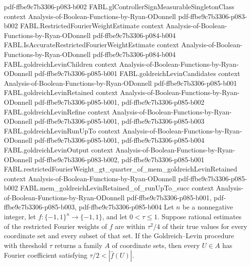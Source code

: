 \begin{theorem}
  {pdf-ffbe9c7b3306-p083-b002}
\proofstep
  {FABL.glControllerSignMeasurableSingletonClass}
  {context}
  {Analysis-of-Boolean-Functions-by-Ryan-ODonnell}
  {pdf-ffbe9c7b3306-p083-b002}
\proofstep
  {FABL.RestrictedFourierWeightEstimate}
  {context}
  {Analysis-of-Boolean-Functions-by-Ryan-ODonnell}
  {pdf-ffbe9c7b3306-p084-b004}
\proofstep
  {FABL.IsAccurateRestrictedFourierWeightEstimate}
  {context}
  {Analysis-of-Boolean-Functions-by-Ryan-ODonnell}
  {pdf-ffbe9c7b3306-p084-b004}
\proofstep
  {FABL.goldreichLevinChildren}
  {context}
  {Analysis-of-Boolean-Functions-by-Ryan-ODonnell}
  {pdf-ffbe9c7b3306-p085-b001}
\proofstep
  {FABL.goldreichLevinCandidates}
  {context}
  {Analysis-of-Boolean-Functions-by-Ryan-ODonnell}
  {pdf-ffbe9c7b3306-p085-b001}
\proofstep
  {FABL.goldreichLevinRetained}
  {context}
  {Analysis-of-Boolean-Functions-by-Ryan-ODonnell}
  {pdf-ffbe9c7b3306-p085-b001,
    pdf-ffbe9c7b3306-p085-b002}
\proofstep
  {FABL.goldreichLevinRefine}
  {context}
  {Analysis-of-Boolean-Functions-by-Ryan-ODonnell}
  {pdf-ffbe9c7b3306-p085-b001,
    pdf-ffbe9c7b3306-p085-b003}
\proofstep
  {FABL.goldreichLevinRunUpTo}
  {context}
  {Analysis-of-Boolean-Functions-by-Ryan-ODonnell}
  {pdf-ffbe9c7b3306-p085-b001,
    pdf-ffbe9c7b3306-p085-b004}
\proofstep
  {FABL.goldreichLevinOutput}
  {context}
  {Analysis-of-Boolean-Functions-by-Ryan-ODonnell}
  {pdf-ffbe9c7b3306-p083-b002,
    pdf-ffbe9c7b3306-p085-b001}
\proofstep
  {FABL.restrictedFourierWeight_gt_quarter_of_mem_goldreichLevinRetained}
  {context}
  {Analysis-of-Boolean-Functions-by-Ryan-ODonnell}
  {pdf-ffbe9c7b3306-p085-b002}
\proofstep
  {FABL.mem_goldreichLevinRetained_of_runUpTo_succ}
  {context}
  {Analysis-of-Boolean-Functions-by-Ryan-ODonnell}
  {pdf-ffbe9c7b3306-p085-b001,
    pdf-ffbe9c7b3306-p085-b003,
    pdf-ffbe9c7b3306-p085-b004}
Let $n$ be a nonnegative integer, let $f:\{-1,1\}^n\to\{-1,1\}$, and let $0<\tau\le1$.
Suppose rational estimates of the restricted Fourier weights of $f$ are within
$\tau^2/4$ of their true values for every coordinate set and every subset of that set.
If the Goldreich–Levin procedure with threshold $\tau$ returns a family $A$ of
coordinate sets, then every $U\in A$ has Fourier coefficient satisfying
$\tau/2<|\widehat f(U)|$.
\end{theorem}

